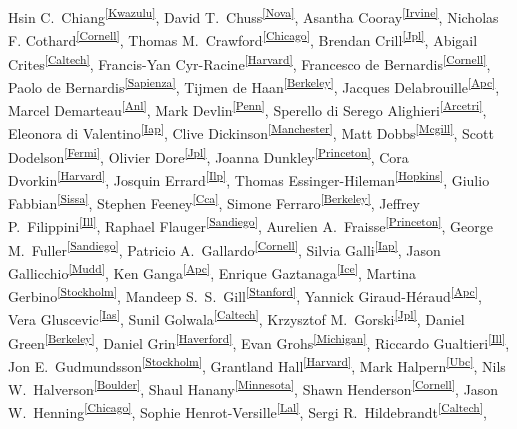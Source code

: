 \begin{raggedright}
Hsin C.~Chiang\textsuperscript{\ref{Kwazulu}},
David T.~Chuss\textsuperscript{\ref{Nova}},
Asantha Cooray\textsuperscript{\ref{Irvine}}, 
Nicholas F. Cothard\textsuperscript{\ref{Cornell}}, 
Thomas M.~Crawford\textsuperscript{\ref{Chicago}}, 
Brendan Crill\textsuperscript{\ref{Jpl}},
Abigail Crites\textsuperscript{\ref{Caltech}},
Francis-Yan Cyr-Racine\textsuperscript{\ref{Harvard}},
Francesco de Bernardis\textsuperscript{\ref{Cornell}}, 
Paolo de Bernardis\textsuperscript{\ref{Sapienza}},
Tijmen de Haan\textsuperscript{\ref{Berkeley}},
Jacques Delabrouille\textsuperscript{\ref{Apc}}, 
Marcel Demarteau\textsuperscript{\ref{Anl}},
Mark Devlin\textsuperscript{\ref{Penn}}, 
Sperello di Serego Alighieri\textsuperscript{\ref{Arcetri}}, 
Eleonora di Valentino\textsuperscript{\ref{Iap}},
Clive Dickinson\textsuperscript{\ref{Manchester}},
Matt Dobbs\textsuperscript{\ref{Mcgill}},
Scott Dodelson\textsuperscript{\ref{Fermi}}, 
Olivier Dore\textsuperscript{\ref{Jpl}},
Joanna Dunkley\textsuperscript{\ref{Princeton}},
Cora Dvorkin\textsuperscript{\ref{Harvard}},
Josquin Errard\textsuperscript{\ref{Ilp}},
Thomas Essinger-Hileman\textsuperscript{\ref{Hopkins}},
Giulio Fabbian\textsuperscript{\ref{Sissa}},
Stephen Feeney\textsuperscript{\ref{Cca}},
Simone Ferraro\textsuperscript{\ref{Berkeley}}, 
Jeffrey P.~Filippini\textsuperscript{\ref{Ill}},
Raphael Flauger\textsuperscript{\ref{Sandiego}}, 
Aurelien A.~Fraisse\textsuperscript{\ref{Princeton}},
George M.~Fuller\textsuperscript{\ref{Sandiego}},
Patricio A.~Gallardo\textsuperscript{\ref{Cornell}},
Silvia Galli\textsuperscript{\ref{Iap}},
Jason Gallicchio\textsuperscript{\ref{Mudd}},
Ken Ganga\textsuperscript{\ref{Apc}},
Enrique Gaztanaga\textsuperscript{\ref{Ice}},
Martina Gerbino\textsuperscript{\ref{Stockholm}},
Mandeep S.~S.~Gill\textsuperscript{\ref{Stanford}},
Yannick Giraud-Héraud\textsuperscript{\ref{Apc}},
Vera Gluscevic\textsuperscript{\ref{Ias}},
Sunil Golwala\textsuperscript{\ref{Caltech}},
Krzysztof M.~Gorski\textsuperscript{\ref{Jpl}},
Daniel Green\textsuperscript{\ref{Berkeley}},
Daniel Grin\textsuperscript{\ref{Haverford}},
Evan Grohs\textsuperscript{\ref{Michigan}},
Riccardo Gualtieri\textsuperscript{\ref{Ill}}, 
Jon E.~Gudmundsson\textsuperscript{\ref{Stockholm}},
Grantland Hall\textsuperscript{\ref{Harvard}},
Mark Halpern\textsuperscript{\ref{Ubc}},
Nils W.~Halverson\textsuperscript{\ref{Boulder}},
Shaul Hanany\textsuperscript{\ref{Minnesota}},
Shawn Henderson\textsuperscript{\ref{Cornell}},
Jason W.~Henning\textsuperscript{\ref{Chicago}},
Sophie Henrot-Versille\textsuperscript{\ref{Lal}},
Sergi R.~Hildebrandt\textsuperscript{\ref{Caltech}},

\end{raggedright}
